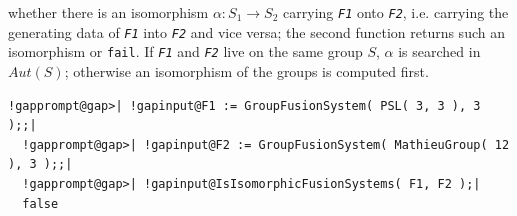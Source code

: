 \documentclass[a4paper,11pt]{report}
\begin{document}
{{{ whether there is an isomorphism $\alpha: S_1 \to S_2$ carrying \mbox{\texttt{\mdseries\slshape F1}} onto \mbox{\texttt{\mdseries\slshape F2}}, i.e. carrying the generating data of \mbox{\texttt{\mdseries\slshape F1}} into \mbox{\texttt{\mdseries\slshape F2}} and vice versa; the second function returns such an isomorphism or \texttt{fail}. If \mbox{\texttt{\mdseries\slshape F1}} and \mbox{\texttt{\mdseries\slshape F2}} live on the same group $S$, $\alpha$ is searched in $Aut(S)$; otherwise an isomorphism of the groups is computed first. 
\begin{Verbatim}[commandchars=!@|,fontsize=\small,frame=single,label=Example]
  !gapprompt@gap>| !gapinput@F1 := GroupFusionSystem( PSL( 3, 3 ), 3 );;|
  !gapprompt@gap>| !gapinput@F2 := GroupFusionSystem( MathieuGroup( 12 ), 3 );;|
  !gapprompt@gap>| !gapinput@IsIsomorphicFusionSystems( F1, F2 );|
  false
\end{Verbatim}
 }

 }

 }

 
\end{document}

